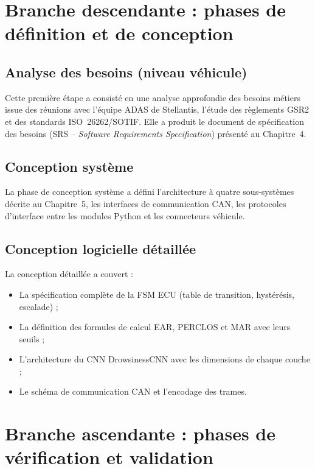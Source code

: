 \documentclass[12pt,a4paper]{report}
\begin{document}
\section{Branche descendante : phases de d\'efinition et de conception}

\subsection{Analyse des besoins (niveau v\'ehicule)}

Cette premi\`ere \'etape a consisté en une analyse approfondie des besoins m\'etiers issue des r\'eunions avec l'\'equipe ADAS de Stellantis, l'\'etude des r\`eglements GSR2 et des standards ISO~26262/SOTIF. Elle a produit le document de sp\'ecification des besoins (SRS -- \textit{Software Requirements Specification}) pr\'esent\'e au Chapitre~4.

\subsection{Conception syst\`eme}

La phase de conception syst\`eme a d\'efini l'architecture \`a quatre sous-syst\`emes d\'ecrite au Chapitre~5, les interfaces de communication CAN, les protocoles d'interface entre les modules Python et les connecteurs v\'ehicule.

\subsection{Conception logicielle d\'etaill\'ee}

La conception d\'etaill\'ee a couvert :
\begin{itemize}
  \item La sp\'ecification compl\`ete de la FSM ECU (table de transition, hyst\'er\'esis, escalade) ;
  \item La d\'efinition des formules de calcul EAR, PERCLOS et MAR avec leurs seuils ;
  \item L'architecture du CNN DrowsinessCNN avec les dimensions de chaque couche ;
  \item Le sch\'ema de communication CAN et l'encodage des trames.
\end{itemize}

\section{Branche ascendante : phases de v\'erification et validation}
\end{document}
